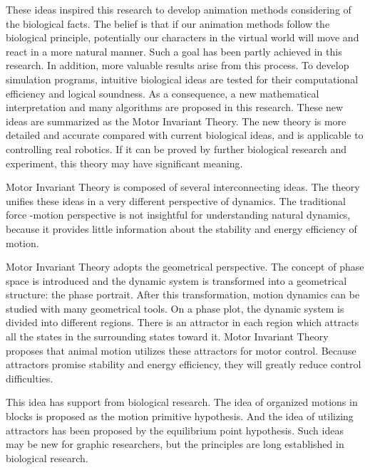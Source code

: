 These ideas inspired this research to develop animation methods considering of the biological facts. 
The belief is that if our animation methods follow the biological principle, potentially our characters in the virtual world will move and react in a more natural manner. Such a goal has been partly achieved in this research.  
In addition, more valuable results arise from this process. 
To develop simulation programs, intuitive biological ideas are tested for their computational efficiency and logical soundness. 
As a consequence, a new mathematical interpretation and many algorithms are proposed in this research. 
These new ideas are summarized as the Motor Invariant Theory. The new theory is more detailed and accurate compared with current biological ideas, and is applicable to controlling real robotics. 
If it can be proved by further biological research and experiment, this theory may have significant meaning.

Motor Invariant Theory is composed of several interconnecting ideas. 
The theory unifies these ideas in a very different perspective of dynamics. 
The traditional force -motion perspective is not insightful for understanding natural dynamics, because it provides little information about the stability and energy efficiency of motion. 

Motor Invariant Theory adopts the geometrical perspective. 
The concept of phase space is introduced and the dynamic system is transformed into a geometrical structure: the phase portrait. 
After this transformation, motion dynamics can be studied with many geometrical tools. 
On a phase plot, the dynamic system is divided into different regions. 
There is an attractor in each region which attracts all the states in the surrounding states toward it. 
Motor Invariant Theory proposes that animal motion utilizes these attractors for motor control. 
Because attractors promise stability and energy efficiency, they will greatly reduce control difficulties.
 
This idea has support from biological research. 
The idea of organized motions in blocks is proposed  as the motion primitive hypothesis. 
And the idea of utilizing attractors has been proposed by  the equilibrium point hypothesis. 
Such ideas may be new for graphic researchers, but the principles are long established in biological research.


